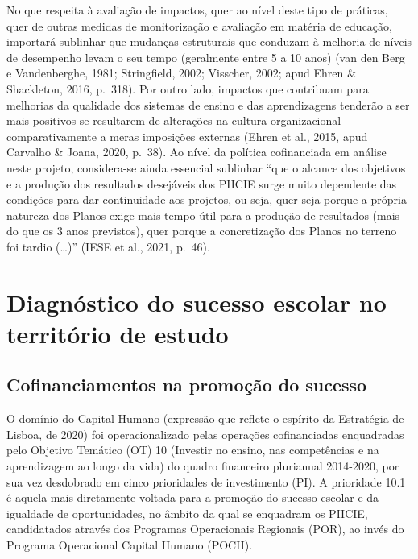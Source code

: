 \documentclass[
]{book}
\theoremstyle{definition}
\theoremstyle{definition}
\theoremstyle{definition}
\theoremstyle{definition}
\theoremstyle{remark}
\begin{document}
No que respeita à avaliação de impactos, quer ao nível deste tipo de práticas, quer de outras medidas de monitorização e avaliação em matéria de educação, importará sublinhar que mudanças estruturais que conduzam à melhoria de níveis de desempenho levam o seu tempo (geralmente entre 5 a 10 anos) (van den Berg e Vandenberghe, 1981; Stringfield, 2002; Visscher, 2002; apud Ehren \& Shackleton, 2016, p.~318). Por outro lado, impactos que contribuam para melhorias da qualidade dos sistemas de ensino e das aprendizagens tenderão a ser mais positivos se resultarem de alterações na cultura organizacional comparativamente a meras imposições externas (Ehren et al., 2015, apud Carvalho \& Joana, 2020, p.~38). Ao nível da política cofinanciada em análise neste projeto, considera-se ainda essencial sublinhar ``que o alcance dos objetivos e a produção dos resultados desejáveis dos PIICIE surge muito dependente das condições para dar continuidade aos projetos, ou seja, quer seja porque a própria natureza dos Planos exige mais tempo útil para a produção de resultados (mais do que os 3 anos previstos), quer porque a concretização dos Planos no terreno foi tardio (\ldots)'' (IESE et al., 2021, p.~46).

\hypertarget{diagnuxf3stico-do-sucesso-escolar-no-territuxf3rio-de-estudo}{%
\chapter{Diagnóstico do sucesso escolar no território de estudo}\label{diagnuxf3stico-do-sucesso-escolar-no-territuxf3rio-de-estudo}}

\hypertarget{cofinanciamentos-na-promouxe7uxe3o-do-sucesso}{%
\section{Cofinanciamentos na promoção do sucesso}\label{cofinanciamentos-na-promouxe7uxe3o-do-sucesso}}

O domínio do Capital Humano (expressão que reflete o espírito da Estratégia de Lisboa, de 2020) foi operacionalizado pelas operações cofinanciadas enquadradas pelo Objetivo Temático (OT) 10 (Investir no ensino, nas competências e na aprendizagem ao longo da vida) do quadro financeiro plurianual 2014-2020, por sua vez desdobrado em cinco prioridades de investimento (PI). A prioridade 10.1 é aquela mais diretamente voltada para a promoção do sucesso escolar e da igualdade de oportunidades, no âmbito da qual se enquadram os PIICIE, candidatados através dos Programas Operacionais Regionais (POR), ao invés do Programa Operacional Capital Humano (POCH).
\end{document}
